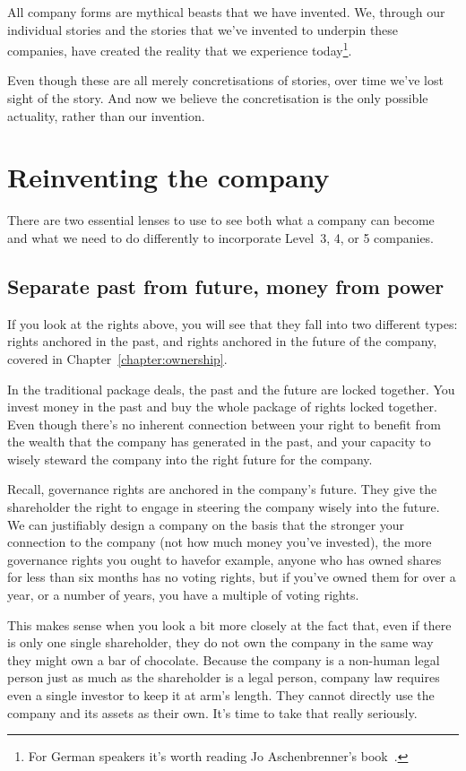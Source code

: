 All company forms are mythical beasts that we have invented. We, through our individual stories and the stories that we've invented to underpin these companies, have created the reality that we experience today\footnote{For German speakers it's worth reading Jo Aschenbrenner's book~\cite{aschenbrenner-purpose}. }.


Even though these are all merely concretisations of stories, over time we’ve lost sight of the story. And now we believe the concretisation is the only possible actuality, rather than our invention.




\section{Reinventing the company}
There are two essential lenses to use to see both what a company can become and what we need to do differently to incorporate Level~3, 4, or 5 companies.
\subsection{Separate past from future, money from power}
If you look at the rights above, you will see that they fall into two different types: rights anchored in the past, and rights anchored in the future of the company, covered in  Chapter~\ref{chapter:ownership}.


In the traditional package deals, the past and the future are locked together. You invest money in the past and buy the whole package of rights locked together. Even though there's no inherent connection between your right to benefit from the wealth that the company has generated in the past, and your capacity to wisely steward the company into the right future for the company.


Recall, governance rights are anchored in the company’s future. They give the shareholder the right to engage in steering the company wisely into the future. We can justifiably design a company on the basis that the stronger your connection to the company (not how much money you’ve invested), the more governance rights you ought to have\textemdash for example, anyone who has owned shares for less than six months has no voting rights, but if you’ve owned them for over a year, or a number of years, you have a multiple of voting rights.


This makes sense when you look a bit more closely at the fact that, even if there is only one single shareholder, they do not own the company in the same way they might own a bar of chocolate. Because the company is a non-human legal person just as much as the shareholder is a legal person, company law requires even a single investor to keep it at arm’s length. They cannot directly use the company and its assets as their own. It's time to take that really seriously.


